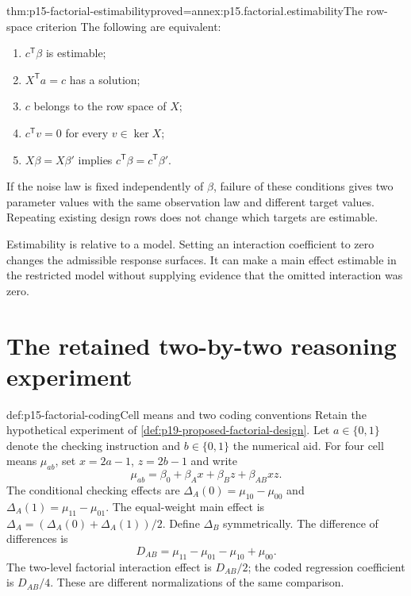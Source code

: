 \begin{hbtheorem}{thm:p15-factorial-estimability}{proved=annex:p15.factorial.estimability}{The row-space criterion}
The following are equivalent:
\begin{enumerate}
\item \(c^{\mathsf T}\beta\) is estimable;
\item \(X^{\mathsf T}a=c\) has a solution;
\item \(c\) belongs to the row space of \(X\);
\item \(c^{\mathsf T}v=0\) for every \(v\in\ker X\);
\item \(X\beta=X\beta'\) implies
      \(c^{\mathsf T}\beta=c^{\mathsf T}\beta'\).
\end{enumerate}
If the noise law is fixed independently of \(\beta\), failure of these
conditions gives two parameter values with the same observation law and
different target values. Repeating existing design rows does not change
which targets are estimable.
\end{hbtheorem}

Estimability is relative to a model. Setting an interaction coefficient to
zero changes the admissible response surfaces. It can make a main effect
estimable in the restricted model without supplying evidence that the omitted
interaction was zero.

\section{The retained two-by-two reasoning experiment}
\label{sec:p15-factorial-two-by-two}

\begin{hbdefinition}{def:p15-factorial-coding}{Cell means and two coding conventions}
Retain the hypothetical experiment of
\cref{def:p19-proposed-factorial-design}. Let \(a\in\{0,1\}\) denote
the checking instruction and \(b\in\{0,1\}\) the numerical aid. For
four cell means \(\mu_{ab}\), set \(x=2a-1\), \(z=2b-1\) and write
\[
 \mu_{ab}=\beta_0+\beta_Ax+\beta_Bz+\beta_{AB}xz.
\]
The conditional checking effects are
\(\Delta_A(0)=\mu_{10}-\mu_{00}\) and
\(\Delta_A(1)=\mu_{11}-\mu_{01}\). The equal-weight main effect is
\(\Delta_A=(\Delta_A(0)+\Delta_A(1))/2\). Define \(\Delta_B\)
symmetrically. The difference of differences is
\[
 D_{AB}=\mu_{11}-\mu_{01}-\mu_{10}+\mu_{00}.
\]
The two-level factorial interaction effect is \(D_{AB}/2\); the coded
regression coefficient is \(D_{AB}/4\). These are different normalizations
of the same comparison.
\end{hbdefinition}


